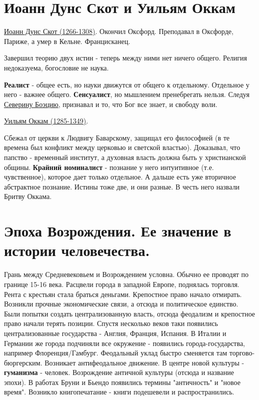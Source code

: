 \section{Иоанн Дунс Скот и Уильям Оккам}
\hspace{8pt} 
\underline{Иоанн Дунс Скот (1266-1308)}. Окончил Оксфорд. Преподавал в Оксфорде, Париже, а умер в Кельне. Францисканец.

Завершил теорию двух истин - теперь между ними нет ничего общего. Религия недоказуема, богословие не наука. 

\textbf{Реалист} - общее есть, но науки движутся от общего к отдельному. Отдельное у  него - важнее общего. \textbf{Сенсуалист}, но мышлением пренебрегать нельзя. Следуя \underline{Северину Боэцию}, признавал и то, что Бог все знает, и свободу воли.  
 
\underline{Уильям Оккам (1285-1349)}. 

Сбежал от церкви к Людвигу Баварскому, защищал его философией (в те времена был конфликт между церковью и светской властью). Доказывал, что папство - временный институт, а духовная власть должна быть у христианской общины. \textbf{Крайний номиналист} - познание у него интуитивное (т.е. чувственное), которое дает только отдельное. А дальше есть уже вторичное абстрактное познание. Истины тоже две, и они разные. В честь него назвали Бритву Оккама.

\section{Эпоха Возрождения. Ее значение в истории человечества.}
Грань между Средневековьем и Возрождением условна. Обычно ее проводят по границе 15-16 века. Расцвели города в западной Европе, поднялась торговля. Рента с крестьян стала браться деньгами. Крепостное право начало отмирать. Возникли прочные экономические связи, а отсюда и политическое единство. Были попытки создать централизованную власть, отсюда феодализм и крепостное право начали терять позиции. Спустя несколько веков таки появились централизованные государства - Англия, Франция, Испания. В Италии и Германии же города подчиняли все окружение - появились города-государства, например Флоренция/Гамбург. Феодальный уклад быстро сменяется там торгово-бюргерским. Возникает антифеодальное движение. В центре новой культуры - \textbf{гуманизма} - человек. Возрождение античной культуры (отсюда и название эпохи). В работах Бруни и Бьендо появились термины "античность" и "новое время". Возникло книгопечатание - книги подешевели и распространились. 

